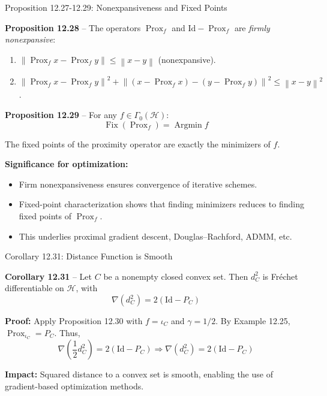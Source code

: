 \documentclass[aspectratio=169,10pt]{beamer}
\newcommand{\cH}{\mathcal{H}}
\newcommand{\norm}[1]{\left\|#1\right\|}
\newcommand{\Argmin}{\operatorname{Argmin}}
\newcommand{\Fix}{\operatorname{Fix}}
\newcommand{\Prox}{\operatorname{Prox}}
\begin{document}
\begin{frame}[allowframebreaks]{Proposition 12.27-12.29: Nonexpansiveness and Fixed Points}

  \textbf{Proposition 12.28} -- The operators $\Prox_f$ and $\text{Id} - \Prox_f$ are
  \textit{firmly nonexpansive}:

  \begin{enumerate}
    \item[(a)] $\norm{\Prox_f x - \Prox_f y} \le \norm{x - y}$ (nonexpansive).
    \item[(b)] $\norm{\Prox_f x - \Prox_f y}^2 + \norm{(x - \Prox_f x) - (y - \Prox_f y)}^2 \le \norm{x - y}^2$.
  \end{enumerate}

  \vspace{0.5cm}

  \textbf{Proposition 12.29} -- For any $f \in \Gamma_0(\cH)$:
  \[
    \Fix(\Prox_f) = \Argmin f
  \]

  The fixed points of the proximity operator are exactly the minimizers of $f$.

  \framebreak

  \textbf{Significance for optimization:}
  \begin{itemize}
    \item Firm nonexpansiveness ensures convergence of iterative schemes.
    \item Fixed-point characterization shows that finding minimizers
      reduces to finding fixed points of $\Prox_f$.
    \item This underlies proximal gradient descent, Douglas--Rachford, ADMM, etc.
  \end{itemize}

\end{frame}

\begin{frame}{Corollary 12.31: Distance Function is Smooth}

  \textbf{Corollary 12.31} -- Let $C$ be a nonempty closed convex set.
  Then $d_C^2$ is Fréchet differentiable on $\cH$, with
  \[
    \nabla(d_C^2) = 2(\text{Id} - P_C)
  \]

  \vspace{1cm}

  \textbf{Proof:} Apply Proposition 12.30 with $f = \iota_C$ and $\gamma = 1/2$.
  By Example 12.25, $\Prox_{\iota_C} = P_C$. Thus,
  \[
    \nabla \left( \frac{1}{2} d_C^2 \right) = 2(\text{Id} - P_C) \Rightarrow
    \nabla(d_C^2) = 2(\text{Id} - P_C)
  \]

  \vspace{1cm}

  \textbf{Impact:} Squared distance to a convex set is smooth, enabling
  the use of gradient-based optimization methods.

\end{frame}
\end{document}
